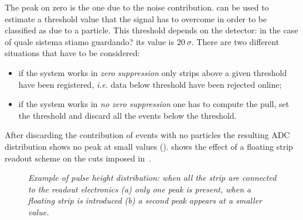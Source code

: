 The peak on zero is the one due to the noise contribution.  can be
used to estimate a threshold value that the signal has to overcome in order to
be classified as due to a particle. This threshold depends on the detector:
in the case of {\color{red}  quale sistema stiamo guardando?} its value is $20\ \sigma$.
There are two different situations that have to be considered:
\begin{itemize}
\item if the system works in {\em zero suppression} only strips above a given threshold
  have been registered, {\it i.e.} data below threshold have been rejected online;
\item if the system works in {\em no zero suppression} one has to compute the pull, set the threshold
  and discard all the events below the threshold.
\end{itemize}
After discarding the contribution of events with no particles the
resulting ADC distribution shows no peak at small values
().  shows the effect of a floating strip
readout scheme on the cuts imposed in~.
\begin{figure}[!htbp]
 \caption{\it Example of pulse height distribution: when all the strip are connected to
   the readout electronics (a) only one peak is present, when a floating strip
   is introduced (b) a second peak appears at a smaller value.}\label{fig:ph}
\end{figure}

